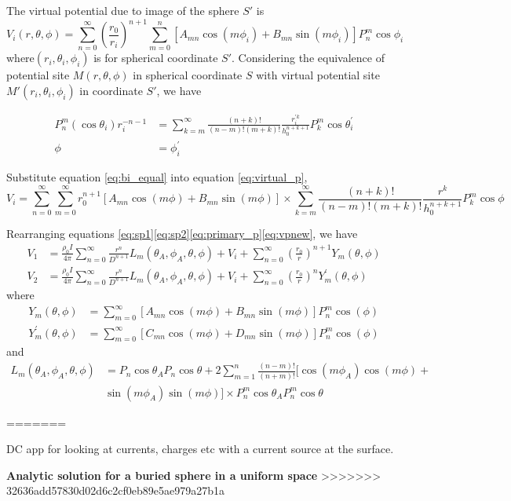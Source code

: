 \documentclass[11pt,letterpaper,leqno]{amsart}
\numberwithin{equation}{section}
\begin{document}
The virtual potential due to image of the sphere $S'$ is
\begin{equation}\label{eq:virtual_p}
V_i(r,\theta,\phi) = \sum\limits_{n=0}^\infty(\frac{r_0}{r_i})^{n+1}\sum\limits_{m=0}^n [A_{mn}\cos(m\phi_i) + B_{mn}\sin(m\phi_i)]P_n^m\cos\phi_i
\end{equation}
where$(r_i,\theta_i,\phi_i)$ is for spherical coordinate $S'$. Considering the equivalence of potential site $M(r,\theta,\phi)$ in spherical coordinate $S$ with virtual potential site $M'(r_i,\theta_i,\phi_i)$ in coordinate $S'$, we have

\begin{subequations}\label{eq:bi_equal}
\begin{align}
P_n^m(\cos\theta_i)r_i^{-n-1} &= \sum\limits_{k=m}^\infty \frac{(n+k)!}{(n-m)!(m+k)!}\frac{r_i^{\prime	k}}{h_0^{n+k+1}}P_k^m\cos\theta_i^\prime \\
\phi &= \phi_i^\prime
\end{align}
\end{subequations}

Substitute equation \eqref{eq:bi_equal} into equation \eqref{eq:virtual_p}, 
\begin{equation}\label{eq:vpnew}
V_i = \sum\limits_{n=0}^\infty\sum\limits_{m=0}^\infty r_0^{n+1}[A_{mn}\cos(m\phi) + B_{mn}\sin(m\phi)] \times \sum\limits_{k=m}^\infty\frac{(n+k)!}{(n-m)!(m+k)!}\frac{r^k}{h_0^{n+k+1}}P_k^m\cos\phi
\end{equation}

Rearranging equations \eqref{eq:sp1}\eqref{eq:sp2}\eqref{eq:primary_p}\eqref{eq:vpnew}, we have
\begin{align}
V_1 &= \frac{\rho_0 I}{4\pi}\sum\limits_{n=0}^\infty\frac{r^n}{D^{n+1}}L_m(\theta_A,\phi_A,\theta,\phi) + V_i + \sum\limits_{n=0}^\infty(\frac{r_0}{r})^{n+1}Y_m(\theta,\phi) \\
V_2 &= \frac{\rho_0 I}{4\pi}\sum\limits_{n=0}^\infty\frac{r^n}{D^{n+1}}L_m(\theta_A,\phi_A,\theta,\phi) + V_i + \sum\limits_{n=0}^\infty(\frac{r_0}{r})^{n}Y^\prime_m(\theta,\phi)
\end{align}
where
\begin{align}
Y_m(\theta,\phi) &= \sum\limits_{m=0}^\infty[A_{mn}\cos(m\phi)+B_{mn}\sin(m\phi)]P_n^m\cos(\phi) \\
Y_m^\prime(\theta,\phi) &= \sum\limits_{m=0}^\infty[C_{mn}\cos(m\phi)+D_{mn}\sin(m\phi)]P_n^m\cos(\phi) 
\end{align}
and
\begin{equation}
\begin{split}
L_m(\theta_A,\phi_A,\theta,\phi) &= P_n\cos\theta_A P_n\cos\theta + 2\sum\limits_{m=1}^n\frac{(n-m)!}{(n+m)!}[\cos(m\phi_A)\cos(m\phi) + \\
&\sin(m\phi_A)\sin(m\phi)] \times P_n^m\cos\theta_A P_n^m\cos\theta
\end{split}
\end{equation}

=======


DC app for looking at currents, charges etc with a current source at the surface.


 \vspace{0.4cm}



\Large
\textbf{Analytic solution for a buried sphere in a uniform space}
>>>>>>> 32636add57830d02d6c2cf0eb89e5ae979a27b1a


\end{document}
